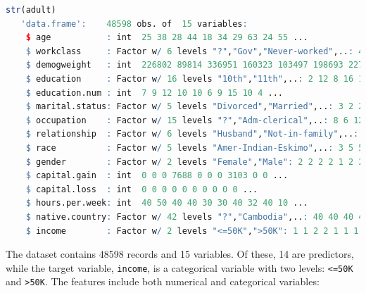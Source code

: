 \documentclass[
  11pt,
]{book}
\newcommand{\passthrough}[1]{#1}
\theoremstyle{definition}
\theoremstyle{definition}
\theoremstyle{definition}
\theoremstyle{definition}
\theoremstyle{remark}
\begin{document}
\begin{lstlisting}[language=R]
str(adult)
   'data.frame':    48598 obs. of  15 variables:
    $ age           : int  25 38 28 44 18 34 29 63 24 55 ...
    $ workclass     : Factor w/ 6 levels "?","Gov","Never-worked",..: 4 4 2 4 1 4 1 5 4 4 ...
    $ demogweight   : int  226802 89814 336951 160323 103497 198693 227026 104626 369667 104996 ...
    $ education     : Factor w/ 16 levels "10th","11th",..: 2 12 8 16 16 1 12 15 16 6 ...
    $ education.num : int  7 9 12 10 10 6 9 15 10 4 ...
    $ marital.status: Factor w/ 5 levels "Divorced","Married",..: 3 2 2 2 3 3 3 2 3 2 ...
    $ occupation    : Factor w/ 15 levels "?","Adm-clerical",..: 8 6 12 8 1 9 1 11 9 4 ...
    $ relationship  : Factor w/ 6 levels "Husband","Not-in-family",..: 4 1 1 1 4 2 5 1 5 1 ...
    $ race          : Factor w/ 5 levels "Amer-Indian-Eskimo",..: 3 5 5 3 5 5 3 5 5 5 ...
    $ gender        : Factor w/ 2 levels "Female","Male": 2 2 2 2 1 2 2 2 1 2 ...
    $ capital.gain  : int  0 0 0 7688 0 0 0 3103 0 0 ...
    $ capital.loss  : int  0 0 0 0 0 0 0 0 0 0 ...
    $ hours.per.week: int  40 50 40 40 30 30 40 32 40 10 ...
    $ native.country: Factor w/ 42 levels "?","Cambodia",..: 40 40 40 40 40 40 40 40 40 40 ...
    $ income        : Factor w/ 2 levels "<=50K",">50K": 1 1 2 2 1 1 1 2 1 1 ...
\end{lstlisting}

The dataset contains 48598 records and 15 variables. Of these, 14 are predictors, while the target variable, \passthrough{\lstinline!income!}, is a categorical variable with two levels: \passthrough{\lstinline!<=50K!} and \passthrough{\lstinline!>50K!}. The features include both numerical and categorical variables:
\end{document}
